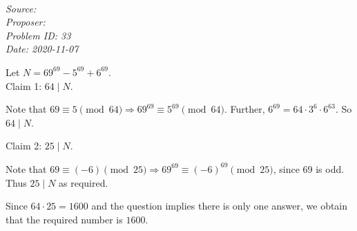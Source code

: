 \SSbreak\\
\emph{Source: \Cop}\\
\emph{Proposer: \Ppi}\\
\emph{Problem ID: 33}\\
\emph{Date: 2020-11-07}\\
\SSbreak

\bigskip

\begin{solution}\hfil\medskip

    Let $N = 69^{69} - 5^{69} + 6^{69}$. \\
    
    Claim 1: $64 \mid N$. 
    
    \begin{subproof}
        Note that $69 \equiv 5 \pmod{64} \Rightarrow 69^{69} \equiv 5^{69} \pmod{64}$. 
        Further, $6^{69}=64\cdot3^{6}\cdot6^{63}$. So $64 \mid N$. 
    \end{subproof}

    Claim 2: $25 \mid N$.

    \begin{subproof}
        Note that $69 \equiv (-6) \pmod{25} \Rightarrow 69^{69} \equiv (-6)^{69} \pmod{25}$, 
        since 69 is odd. Thus $25 \mid N$ as required. 
    \end{subproof}

    Since $64 \cdot 25 = 1600$ and the question implies there is only one answer, 
    we obtain that the required number is $\boxed{1600}$. 
\end{solution}\bigskip